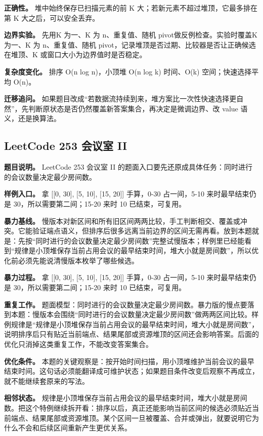 \textbf{正确性。} 堆中始终保存已扫描元素的前 K 大；若新元素不超过堆顶，它最多排在第 K 大之后，可以安全丢弃。

\textbf{边界实验。} 先用K 为一、K 为 n、重复值、随机 pivot做反例检查。实验时覆盖K 为一、K 为 n、重复值、随机 pivot，记录堆顶是否过期、比较器是否让正确候选在堆顶、K 或窗口大小为边界值时是否稳定。

\textbf{复杂度变化。} 排序 O(n log n)，小顶堆 O(n log k) 时间、O(k) 空间；快速选择平均 O(n)。

\textbf{迁移追问。} 如果题目改成“若数据流持续到来，堆方案比一次性快速选择更自然”，先判断原状态是否仍然覆盖新答案集合，再决定是微调边界、改 value 语义，还是换算法。

\subsection{LeetCode 253 会议室 II}

\textbf{题目说明。} LeetCode 253 会议室 II 的题面入口要先还原成具体任务：同时进行的会议数量决定最少房间数。

\textbf{样例入口。} 拿 [[0, 30], [5, 10], [15, 20]] 手算，0-30 占一间，5-10 来时最早结束仍是 30，所以需要第二间；15-20 来时 10 已结束，可复用。

\textbf{暴力基线。} 慢版本对新区间和所有旧区间两两比较，手工判断相交、覆盖或冲突。它能验证端点语义，但排序后很多远离当前边界的区间无需再看。放到本题就是：先按“同时进行的会议数量决定最少房间数”完整试慢版本；样例里已经能看到“规律是小顶堆保存当前占用会议的最早结束时间，堆大小就是房间数”，所以优化前必须先能说清慢版本枚举了哪些候选。

\textbf{暴力过程。} 拿 [[0, 30], [5, 10], [15, 20]] 手算，0-30 占一间，5-10 来时最早结束仍是 30，所以需要第二间；15-20 来时 10 已结束，可复用。

\textbf{重复工作。} 题面模型：同时进行的会议数量决定最少房间数。暴力版的慢点要落到本题：慢版本会围绕“同时进行的会议数量决定最少房间数”做两两区间比较。样例规律是“规律是小顶堆保存当前占用会议的最早结束时间，堆大小就是房间数”，说明排序后只有贴近当前端点、结果尾部或资源堆顶的区间还会影响答案。后面的优化只消掉这类重复工作，不能改变答案集合。

\textbf{优化条件。} 本题的关键观察是：按开始时间扫描，用小顶堆维护当前会议的最早结束时间。这句话必须能翻译成可维护状态；如果题目条件改变后观察不再成立，就不能继续套原来的写法。

\textbf{相邻状态。} 规律是小顶堆保存当前占用会议的最早结束时间，堆大小就是房间数。把这个特例继续拆开看：排序以后，真正还能影响当前区间的候选必须贴近当前端点、结果尾部或资源堆顶。某个区间一旦被覆盖、合并或弹出，就要说明它为什么不会和后续区间重新产生更优关系。

